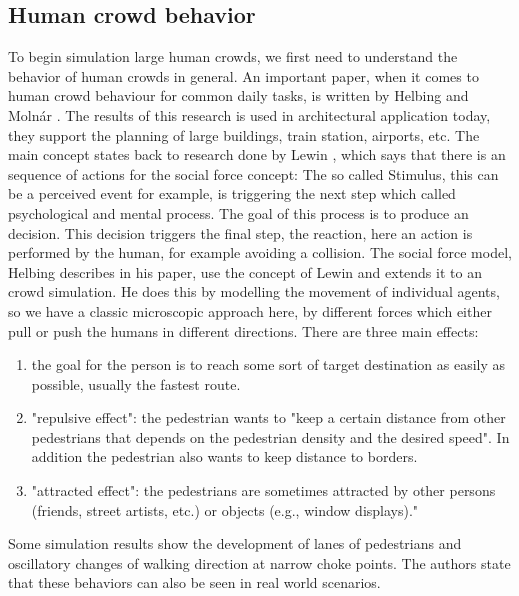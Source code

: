 \documentclass{acmsiggraph}               %
\begin{document}
\subsection{Human crowd behavior}
\label{chap:helbing} To begin simulation large human crowds, we first need to understand the behavior of human crowds in general. An important paper, when it comes to human crowd behaviour for common daily tasks, is written by Helbing and Molnár . 
 The results of this research is used in architectural application today, they support the planning of large buildings, train station, airports, etc.
The main concept states back to research done by Lewin , which says that there is an sequence of actions for the social force concept: The so called Stimulus, this can be a perceived event for example, is triggering the next step which called psychological and mental process. The goal of this process is to produce an decision. This decision triggers the final step, the reaction, here an action is performed by the human, for example avoiding a collision.
The social force model, Helbing describes in his paper, use the concept of Lewin and extends it to an crowd simulation. He does this by modelling the movement of individual agents, so we have a classic microscopic approach here, by different forces which either pull or push the humans in different directions. There are three main effects: 
\begin{enumerate}
    \item the goal for the person is to reach some sort of target destination as easily as possible, usually the fastest route.
    \item "repulsive effect": the pedestrian wants to "keep a certain distance from other pedestrians that depends on the pedestrian density and the desired speed". In addition the pedestrian also wants to keep distance to borders.  
    \item "attracted effect": the pedestrians are sometimes attracted by other persons (friends, street artists, etc.) or objects (e.g., window displays)."
\end{enumerate}
Some simulation results show the development of lanes of pedestrians and oscillatory changes of walking direction at narrow choke points. The authors state that these behaviors can also be seen in real world scenarios. 
\end{document}

